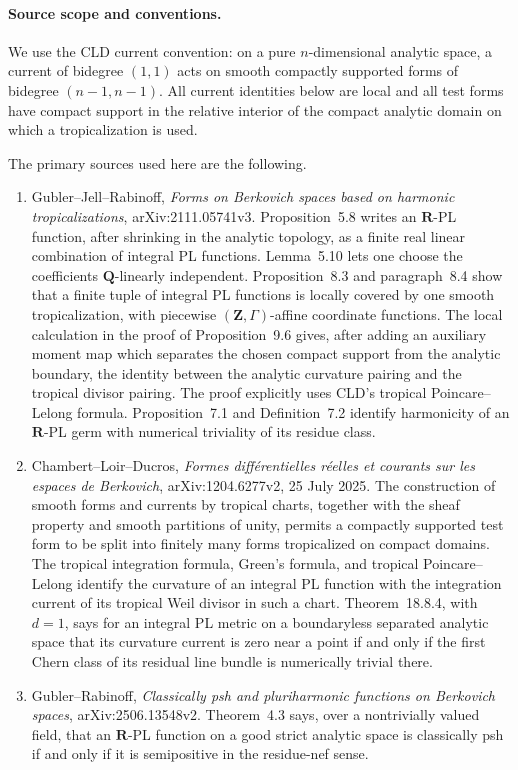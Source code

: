 
\paragraph{Source scope and conventions.}
We use the CLD current convention: on a pure $n$-dimensional analytic
space, a current of bidegree $(1,1)$ acts on smooth compactly supported
forms of bidegree $(n-1,n-1)$.  All current identities below are local and
all test forms have compact support in the relative interior of the compact
analytic domain on which a tropicalization is used.

The primary sources used here are the following.
\begin{enumerate}
\item Gubler--Jell--Rabinoff, \emph{Forms on Berkovich spaces based on
harmonic tropicalizations}, arXiv:2111.05741v3.  Proposition~5.8 writes an
$\mathbf R$-PL function, after shrinking in the analytic topology, as a
finite real linear combination of integral PL functions.  Lemma~5.10 lets
one choose the coefficients $\mathbf Q$-linearly independent.
Proposition~8.3 and paragraph~8.4 show that a finite tuple of integral PL
functions is locally covered by one smooth tropicalization, with
piecewise $(\mathbf Z,\Gamma)$-affine coordinate functions.  The local
calculation in the proof of Proposition~9.6 gives, after adding an auxiliary
moment map which separates the chosen compact support from the analytic
boundary, the identity between the analytic curvature pairing and the
tropical divisor pairing.  The proof explicitly uses CLD's tropical
Poincare--Lelong formula.  Proposition~7.1 and Definition~7.2 identify
harmonicity of an $\mathbf R$-PL germ with numerical triviality of its
residue class.
\item Chambert--Loir--Ducros, \emph{Formes diff\'erentielles r\'eelles et
courants sur les espaces de Berkovich}, arXiv:1204.6277v2, 25 July 2025.
The construction of smooth forms and currents by tropical charts, together
with the sheaf property and smooth partitions of unity, permits a compactly
supported test form to be split into finitely many forms tropicalized on
compact domains.  The tropical integration formula, Green's formula, and
tropical Poincare--Lelong identify the curvature of an integral PL function
with the integration current of its tropical Weil divisor in such a chart.
Theorem~18.8.4, with $d=1$, says for an integral PL metric on a
boundaryless separated analytic space that its curvature current is zero
near a point if and only if the first Chern class of its residual line
bundle is numerically trivial there.
\item Gubler--Rabinoff, \emph{Classically psh and pluriharmonic functions
on Berkovich spaces}, arXiv:2506.13548v2.  Theorem~4.3 says, over a
nontrivially valued field, that an $\mathbf R$-PL function on a good strict
analytic space is classically psh if and only if it is semipositive in the
residue-nef sense.
\end{enumerate}

